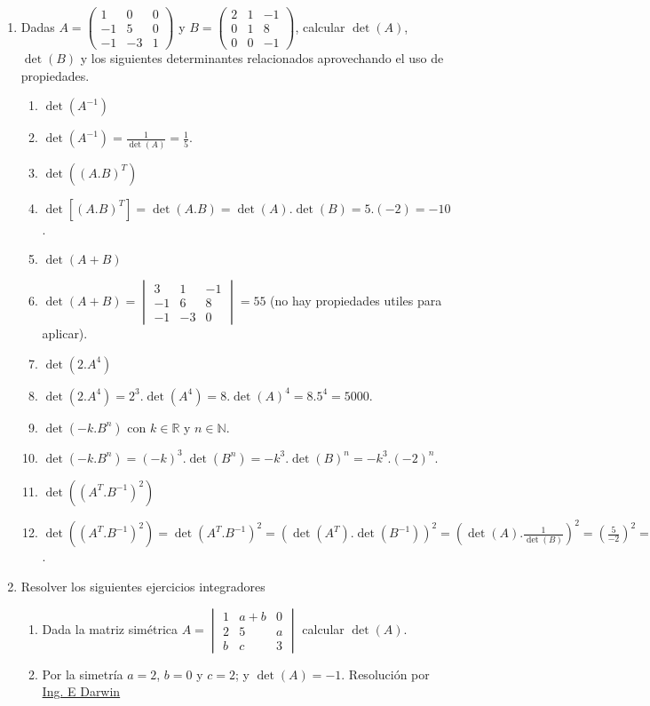 \documentclass[a4paper]{article}
\newcommand{\answer}{\item[**]}
\newcommand{\exercise}{\item}
\begin{document}
\begin{enumerate}
	\exercise Dadas $A=\begin{pmatrix} 1 & 0 & 0 \\ -1 & 5 & 0 \\ -1 & -3 & 1 \end{pmatrix}$ y $B=\begin{pmatrix} 2 & 1 & -1 \\ 0 & 1 & 8 \\ 0 & 0 & -1 \end{pmatrix}$, calcular $\det(A)$, $\det(B)$ y los siguientes determinantes relacionados aprovechando el uso de propiedades.
	\begin{enumerate} [label=(\alph*)]
		
		\item $\det(A^{-1})$
		\answer $\det(A^{-1})=\frac{1}{\det(A)}=\frac{1}{5}$.

		\item $\det\left((A.B)^T\right)$ 
		\answer $\det[(A.B)^T]=\det(A.B)=\det(A).\det(B)=5.(-2)=-10$.

		\item $\det(A+B)$
		\answer $\det(A+B)=\begin{vmatrix} 3 & 1 & -1 \\ -1 & 6 & 8 \\ -1 & -3 & 0 \end{vmatrix}=55$ (no hay propiedades utiles para aplicar).  

		\item $\det(2.A^4)$ 
		\answer $\det(2.A^4)=2^3.\det(A^4)=8.\det(A)^4=8.5^4=5000$.

		\item $\det(-k.B^n)$ con $k\in\mathbb{R}$ y $n\in\mathbb{N}$. 
		\answer $\det(-k.B^n)=(-k)^3.\det(B^n)=-k^3.\det(B)^n=-k^3.(-2)^n$.

		\item $\det\left((A^T.B^{-1})^2\right)$
		\answer $\det\left((A^T.B^{-1})^2\right)=\det(A^T.B^{-1})^2=\left(\det(A^T).\det(B^{-1})\right)^2=\left(\det(A).\displaystyle{\frac{1}{\det(B)}}\right)^2=\left(\frac{5}{-2}\right)^2=\frac{25}{4}$.

	\end{enumerate}


	\exercise Resolver los siguientes ejercicios integradores
	\begin{enumerate} [label=(\alph*)]
		
		\item Dada la matriz simétrica $A=\begin{vmatrix} 1 & a+b & 0 \\ 2 & 5 & a \\ b & c & 3\end{vmatrix}$ calcular $\det(A)$.
		\answer Por la simetría $a=2$, $b=0$ y $c=2$; y $\det(A)=-1$. Resolución por \href{https://youtu.be/FhKTUHGGyhk}{Ing. E Darwin}


\end{enumerate}
\end{enumerate}
\end{document}
